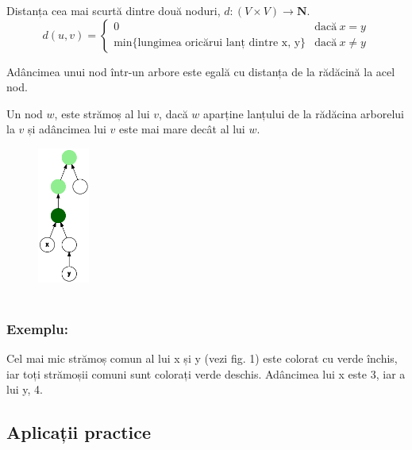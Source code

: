 \documentclass[runningheads]{llncs}
\begin{document}
\renewcommand{\definitionname}{Definiția}
\begin{definition}
Distanța cea mai scurtă dintre două noduri, $d : (V \times V) \to \mathbf{N}$.
$$d(u, v) =
\left\{
	\begin{array}{ll}
		\mbox{0}  & \mbox{dacă} \ x = y \\
		\mbox{min\{lungimea\ oricărui\ lanț\ dintre\ x, y\}}  & \mbox{dacă} \ x \neq y
	\end{array}
\right.
$$
\end{definition}


\renewcommand{\definitionname}{Definiția}
\begin{definition}
Adâncimea unui nod într-un arbore este egală cu distanța de la rădăcină la acel nod.
\end{definition}

\renewcommand{\definitionname}{Definiția}
\begin{definition}
Un nod $w$, este strămoș al lui $v$, dacă $w$ aparține lanțului de la rădăcina arborelui la $v$ și adâncimea lui $v$ este mai mare decât al lui $w$.
\end{definition}

\begin{figure}
    \centering
    \includegraphics[width=0.15\textwidth]{LCA.png}
    \caption{~\cite{lca_poza}}
\end{figure}

\subsubsection{Exemplu:} Cel mai mic strămoș comun al lui x și y (vezi fig. 1) este colorat cu verde închis, iar toți strămoșii comuni sunt colorați verde deschis. Adâncimea lui x este 3, iar a lui y, 4.

\subsection{Aplicații practice}
\end{document}
